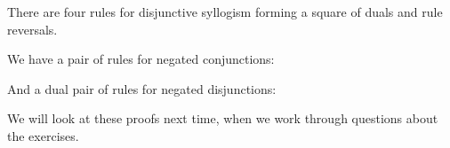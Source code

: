 \begin{fitchrule}
  \label{def:de-morgan-rules}
  \leavevmode
  There are four rules for disjunctive syllogism forming a square of duals
  and rule reversals.

  We have a pair of rules for negated conjunctions: \\

  And a dual pair of rules for negated disjunctions: \\
\end{fitchrule}

We will look at these proofs next time, when we work through questions about
the exercises.


